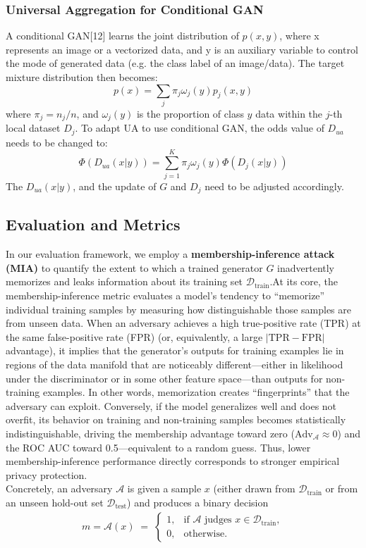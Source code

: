 \documentclass{article}
\begin{document}
\subsubsection{Universal Aggregation for Conditional GAN}
A conditional GAN[12] learns the joint distribution of $p(x, y)$, where x represents an image or a vectorized data, and y is an auxiliary variable to control the mode of generated data (e.g. the class label of an image/data). The target mixture distribution then becomes:
\[
p(x) = \sum_{j} \pi_j \omega_j(y) p_j(x,y)
\]
where $\pi_j = n_j / n$, and $\omega_j(y)$ is the proportion of class $y$ data within the $j$-th local dataset $D_j$.
To adapt UA to use conditional GAN, the odds value of $D_{ua}$ needs to be changed to:
\[
\Phi(D_{ua}(x|y)) = \sum_{j=1}^K \pi_j \omega_j(y) \Phi(D_j(x|y))
\]
The $D_{ua}(x|y)$, and the update of $G$ and $D_j$ need to be adjusted accordingly.


\subsection{Evaluation and Metrics}
In our evaluation framework, we employ a \textbf{membership-inference attack (MIA)} to quantify the extent to which a trained generator $G$ inadvertently memorizes and leaks information about its training set $\mathcal{D}_{\mathrm{train}}$.At its core, the membership-inference metric evaluates a model's tendency to ``memorize'' individual training samples by measuring how distinguishable those samples are from unseen data. When an adversary achieves a high true-positive rate (TPR) at the same false-positive rate (FPR) (or, equivalently, a large $\lvert\mathrm{TPR} - \mathrm{FPR}\rvert$ advantage), it implies that the generator's outputs for training examples lie in regions of the data manifold that are noticeably different—either in likelihood under the discriminator or in some other feature space—than outputs for non-training examples. In other words, memorization creates ``fingerprints'' that the adversary can exploit. Conversely, if the model generalizes well and does not overfit, its behavior on training and non-training samples becomes statistically indistinguishable, driving the membership advantage toward zero ($\mathrm{Adv}_{\mathcal{A}}\approx 0$) and the ROC AUC toward 0.5—equivalent to a random guess. Thus, lower membership-inference performance directly corresponds to stronger empirical privacy protection.\\
Concretely, an adversary $\mathcal{A}$ is given a sample $x$ (either drawn from $\mathcal{D}_{\mathrm{train}}$ or from an unseen hold-out set $\mathcal{D}_{\mathrm{test}}$) and produces a binary decision
\begin{align}
m = \mathcal{A}(x) \;=\; \begin{cases} 
1, & \text{if } \mathcal{A}\text{ judges }x\in \mathcal{D}_{\mathrm{train}},\\ 
0, & \text{otherwise}. 
\end{cases}
\end{align}
\end{document}
